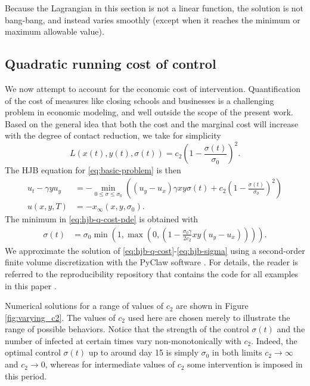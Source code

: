 \documentclass[english,12pt,letter]{article}
\newcommand{\Rnot}{\sigma_0}
\newcommand{\Sinf}{x_\infty}
\begin{document}
Because the Lagrangian in this section is not a linear function, the
solution is not bang-bang, and instead varies smoothly (except when it
reaches the minimum or maximum allowable value).


\subsection{Quadratic running cost of control}
We now attempt to account for the economic cost of intervention.  Quantification
of the cost of measures like closing schools and businesses is a challenging
problem in economic modeling, and well outside the scope of the present work.
Based on the general idea that both the cost and the marginal cost will increase
with the degree of contact reduction, we take for simplicity
$$
    L(x(t),y(t),\sigma(t)) = c_2 \left(1-\frac{\sigma(t)}{\Rnot}\right)^2.
$$
The HJB equation for \eqref{eq:basic-problem} is then
\begin{subequations} \label{eq:hjb-q-cost}
\begin{align} \label{eq:hjb-q-cost-pde}
    u_t - \gamma y u_y & = - \min_{0\le \sigma\le \Rnot} \left((u_y-u_x)\gamma x y \sigma(t) + c_2 \left(1-\frac{\sigma(t)}{\Rnot}\right)^2 \right) \\
    u(x,y,T) & = -\Sinf(x,y,\Rnot).
\end{align}
\end{subequations}
The minimum in \eqref{eq:hjb-q-cost-pde} is obtained with
\begin{align} \label{eq:hjb-sigma}
    \sigma(t) & = \Rnot\min\left(1,\max\left(0,\left(1-\frac{\Rnot\gamma}{2c_2}x y (u_y-u_x)\right)\right)\right).
\end{align}
We approximate the solution of \eqref{eq:hjb-q-cost}-\eqref{eq:hjb-sigma} using a second-order
finite volume discretization with the PyClaw software \cite{2012_pyclaw-sisc,2013_sharpclaw,2016_clawpack}.
For details, the reader is referred to the reproducibility repository that contains the code
for all examples in this paper \cite{ketcheson2021SIRRepro}.

Numerical solutions for a range of values of $c_2$ are shown in Figure \ref{fig:varying_c2}.
The values of $c_2$ used here are chosen merely to illustrate the range of possible behaviors.
Notice that the strength of the control $\sigma(t)$ and the number of infected at certain times vary non-monotonically
with $c_2$.  Indeed, the optimal
control $\sigma(t)$ up to around day 15 is simply $\Rnot$ in both limits $c_2 \to \infty$ and $c_2 \to 0$,
whereas for intermediate values of $c_2$ some intervention is imposed in this period.
\end{document}
